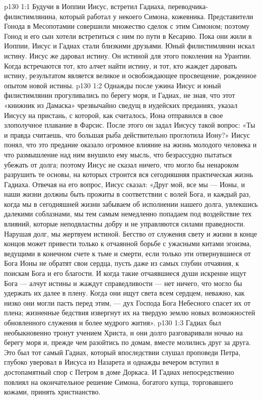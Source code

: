 \vs p130 1:1 Будучи в Иоппии Иисус, встретил Гадиаха, переводчика\hyp{}филистимлянина, который работал у некоего Симона, кожевника. Представители Гонода в Месопотамии совершили множество сделок с этим Симоном; поэтому Гонод и его сын хотели встретиться с ним по пути в Кесарию. Пока они жили в Иоппии, Иисус и Гадиах стали близкими друзьями. Юный филистимлянин искал истину. Иисус же даровал истину. Он  истиной для этого поколения на Урантии. Когда встречаются тот, кто алчет найти истину, и тот, кто жаждет даровать истину, результатом является великое и освобождающее просвещение, рожденное опытом новой истины.
\vs p130 1:2 Однажды после ужина Иисус и юный филистимлянин прогуливались по берегу моря, и Гадиах, не зная, что этот «книжник из Дамаска» чрезвычайно сведущ в иудейских преданиях, указал Иисусу на пристань, с которой, как считалось, Иона отправился в свое злополучное плавание в Фарсис. После этого он задал Иисусу такой вопрос: «Ты и правда считаешь, что большая рыба действительно проглотила Иону?» Иисус понял, что это предание оказало огромное влияние на жизнь молодого человека и что размышление над ним внушило ему мысль, что безрассудно пытаться убежать от долга; поэтому Иисус не сказал ничего, что могло бы ненароком разрушить те основы, на которых строится вся сегодняшняя практическая жизнь Гадиаха. Отвечая на его вопрос, Иисус сказал: «Друг мой, все мы --- Ионы, и наши жизни должны быть прожиты в соответствии с волей Бога, и каждый раз, когда мы в сегодняшней жизни забываем об исполнении нашего долга, увлекшись далекими соблазнами, мы тем самым немедленно попадаем под воздействие тех влияний, которые неподвластны добру и не управляются силами праведности. Нарушая долг, мы жертвуем истиной. Бегство от служения свету и жизни в конце концов может привести только к отчаянной борьбе с ужасными китами эгоизма, ведущими в конечном счете к тьме и смерти, если только эти отвернувшиеся от Бога Ионы не обратят свои сердца, пусть даже из самых глубин отчаяния, к поискам Бога и его благости. И когда такие отчаявшиеся души искренне ищут Бога --- алчут истины и жаждут справедливости --- нет ничего, что могло бы удержать их далее в плену. Когда они ищут света всем сердцем, неважно, как низко они могли пасть перед этим, --- дух Господа Бога Небесного спасет их от плена; жизненные бедствия извергнут их на твердую землю новых возможностей обновленного служения и более мудрого жития».
\vs p130 1:3 Гадиах был необыкновенно тронут учением Христа, и они долго разговаривали ночью на берегу моря и, прежде чем разойтись по домам, вместе молились друг за друга. Это был тот самый Гадиах, который впоследствии слушал проповеди Петра, глубоко уверовал в Иисуса из Назарета и однажды вечером вступил в достопамятный спор с Петром в доме Доркаса. И Гадиах непосредственно повлиял на окончательное решение Симона, богатого купца, торговавшего кожами, принять христианство.
